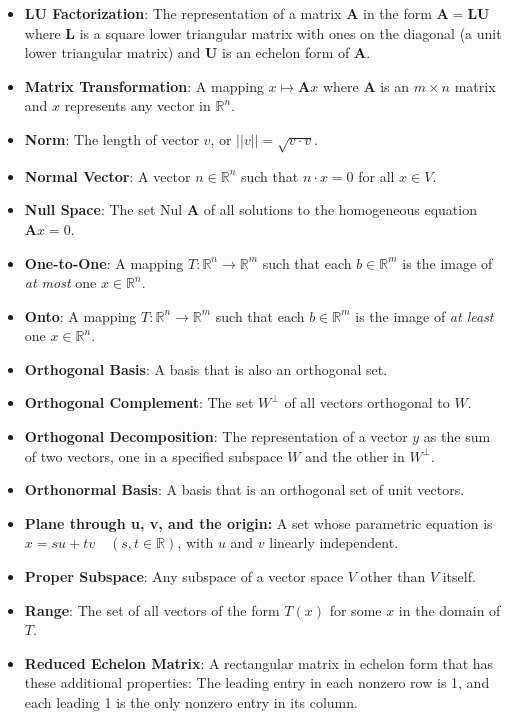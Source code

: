 \begin{itemize}
    \item \textbf{LU Factorization}: The representation of a matrix $\mathbf{A}$ in the form $\mathbf{A}=\mathbf{LU}$ where $\mathbf{L}$ is a square lower triangular matrix with ones on the diagonal (a unit lower triangular matrix) and $\mathbf{U}$ is an echelon form of $\mathbf{A}$.
    \item \textbf{Matrix Transformation}: A mapping $x \mapsto \mathbf{A}x$ where $\mathbf{A}$ is an $m \times n$ matrix and $x$ represents any vector in $\mathbb{R}^n$.
    \item \textbf{Norm}: The length of vector $v$, or $||v|| = \sqrt{v \cdot v}$.
    \item \textbf{Normal Vector}: A vector $n \in \mathbb{R}^n$ such that $n \cdot x = 0$ for all $x \in V$.
    \item \textbf{Null Space}: The set $\text{Nul }\mathbf{A}$ of all solutions to the homogeneous equation $\mathbf{A}x=0$.
    \item \textbf{One-to-One}: A mapping $T: \mathbb{R}^n \to \mathbb{R}^m$ such that each $b \in \mathbb{R}^m$ is the image of \textit{at most} one $x \in \mathbb{R}^n$.
    \item \textbf{Onto}: A mapping $T: \mathbb{R}^n \to \mathbb{R}^m$ such that each $b \in \mathbb{R}^m$ is the image of \textit{at least} one $x \in \mathbb{R}^n$.
    \item \textbf{Orthogonal Basis}: A basis that is also an orthogonal set.
    \item \textbf{Orthogonal Complement}: The set $W^\perp$ of all vectors orthogonal to $W$.
    \item \textbf{Orthogonal Decomposition}: The representation of a vector $y$ as the sum of two vectors, one in a specified subspace $W$ and the other in $W^\perp$.
    \item \textbf{Orthonormal Basis}: A basis that is an orthogonal set of unit vectors.
    \item \textbf{Plane through u, v, and the origin:} A set whose parametric equation is $x = su + tv \quad (s, t \in \mathbb{R})$, with $u$ and $v$ linearly independent.
    \item \textbf{Proper Subspace}: Any subspace of a vector space $V$ other than $V$ itself.
    \item \textbf{Range}: The set of all vectors of the form $T(x)$ for some $x$ in the domain of $T$.
    \item \textbf{Reduced Echelon Matrix}: A rectangular matrix in echelon form that has these additional properties: The leading entry in each nonzero row is 1, and each leading 1 is the only nonzero entry in its column.

\end{itemize}
